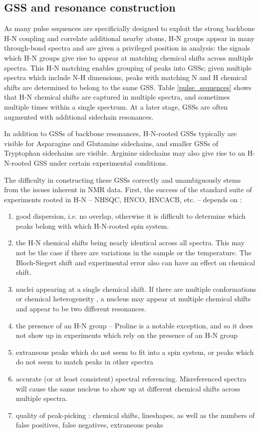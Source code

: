 \subsection*{GSS and resonance construction}
As many pulse sequences are specificially designed to exploit the strong
backbone H-N coupling and correlate additional nearby atoms, H-N groups appear 
in many through-bond spectra and are given a privileged position in analysis: 
the signals which H-N groups give rise to appear at matching chemical shifts
across multiple spectra.
This H-N matching enables grouping of peaks into GSSs; given multiple spectra
which include N-H dimensions, peaks with matching N and H chemical shifts are
determined to belong to the same GSS.
Table \ref{pulse_sequences} shows that H-N chemical shifts are captured in 
multiple spectra, and sometimes multiple times within a single spectrum.
At a later stage, GSSs are often augmented with additional sidechain resonances.
	
In addition to GSSs of backbone resonances, H-N-rooted GSSs typically are 
visible for Asparagine and Glutamine sidechains, and smaller GSSs of 
Tryptophan sidechains are visible.  Arginine sidechains may also give rise 
to an H-N-rooted GSS under certain experimental conditions. 

The difficulty in constructing these GSSs correctly and unambiguously stems 
from the issues inherent in NMR data.  First, the success of the standard 
suite of experiments rooted in H-N -- NHSQC, HNCO, HNCACB, etc. -- depends 
on \cite{autoassign1997}: %
\begin{enumerate}
  \item good dispersion, i.e. no overlap, otherwise it is difficult to determine 
    which peaks belong with which H-N-rooted spin system.
  \item the H-N chemical shifts being nearly identical across all spectra.  
    This may not be the case if there are variations in the sample or the 
    temperature.  The Bloch-Siegert shift and experimental error also can have 
    an effect on chemical shift.
  \item nuclei appearing at a single chemical shift.  If there are multiple 
    conformations or chemical heterogeneity \cite{autoassign1997}, 
    a nucleus may appear at multiple chemical shifts and appear to be two 
    different resonances.
  \item the presence of an H-N group -- Proline is a notable exception, and 
    so it does not show up in experiments which rely on the presence of an H-N group
  \item extraneous peaks which do not seem to fit into a spin system, or 
    peaks which do not seem to match peaks in other spectra
  \item accurate (or at least consistent) spectral referencing.  
    Misreferenced spectra will cause the same nucleus to show up at different 
    chemical shifts across multiple spectra.
  \item quality of peak-picking \cite{autoassign1997, mars}: 
    chemical shifts, lineshapes, as well as the numbers of 
    false positives, false negatives, extraneous peaks
\end{enumerate}

